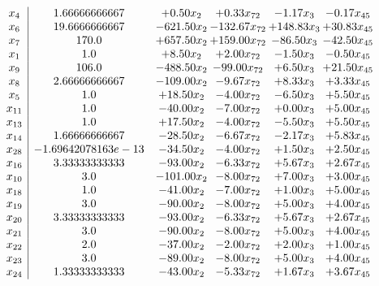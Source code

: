 \documentclass[8pt]{article}
\begin{document}
\[\begin{array}{c| c c@{\hskip 2pt} c@{\hskip 2pt} c@{\hskip 2pt} c@{\hskip 2pt} }
 x_{4}   &  1.66666666667 & +  0.50 x_{2} & +  0.33 x_{72} & -1.17 x_{3} & -0.17 x_{45}\\
 x_{6}   &  19.6666666667 & -621.50 x_{2} & -132.67 x_{72} & + 148.83 x_{3} & + 30.83 x_{45}\\
 x_{7}   &  170.0 & + 657.50 x_{2} & + 159.00 x_{72} & -86.50 x_{3} & -42.50 x_{45}\\
 x_{1}   &  1.0 & +  8.50 x_{2} & +  2.00 x_{72} & -1.50 x_{3} & -0.50 x_{45}\\
 x_{9}   &  106.0 & -488.50 x_{2} & -99.00 x_{72} & +  6.50 x_{3} & + 21.50 x_{45}\\
 x_{8}   &  2.66666666667 & -109.00 x_{2} & -9.67 x_{72} & +  8.33 x_{3} & +  3.33 x_{45}\\
 x_{5}   &  1.0 & + 18.50 x_{2} & -4.00 x_{72} & -6.50 x_{3} & +  5.50 x_{45}\\
 x_{11}   &  1.0 & -40.00 x_{2} & -7.00 x_{72} & +  0.00 x_{3} & +  5.00 x_{45}\\
 x_{13}   &  1.0 & + 17.50 x_{2} & -4.00 x_{72} & -5.50 x_{3} & +  5.50 x_{45}\\
 x_{14}   &  1.66666666667 & -28.50 x_{2} & -6.67 x_{72} & -2.17 x_{3} & +  5.83 x_{45}\\
 x_{28}   &  -1.69642078163e-13 & -34.50 x_{2} & -4.00 x_{72} & +  1.50 x_{3} & +  2.50 x_{45}\\
 x_{16}   &  3.33333333333 & -93.00 x_{2} & -6.33 x_{72} & +  5.67 x_{3} & +  2.67 x_{45}\\
 x_{10}   &  3.0 & -101.00 x_{2} & -8.00 x_{72} & +  7.00 x_{3} & +  3.00 x_{45}\\
 x_{18}   &  1.0 & -41.00 x_{2} & -7.00 x_{72} & +  1.00 x_{3} & +  5.00 x_{45}\\
 x_{19}   &  3.0 & -90.00 x_{2} & -8.00 x_{72} & +  5.00 x_{3} & +  4.00 x_{45}\\
 x_{20}   &  3.33333333333 & -93.00 x_{2} & -6.33 x_{72} & +  5.67 x_{3} & +  2.67 x_{45}\\
 x_{21}   &  3.0 & -90.00 x_{2} & -8.00 x_{72} & +  5.00 x_{3} & +  4.00 x_{45}\\
 x_{22}   &  2.0 & -37.00 x_{2} & -2.00 x_{72} & +  2.00 x_{3} & +  1.00 x_{45}\\
 x_{23}   &  3.0 & -89.00 x_{2} & -8.00 x_{72} & +  5.00 x_{3} & +  4.00 x_{45}\\
 x_{24}   &  1.33333333333 & -43.00 x_{2} & -5.33 x_{72} & +  1.67 x_{3} & +  3.67 x_{45}\\

\end{array}\]
\end{document}
